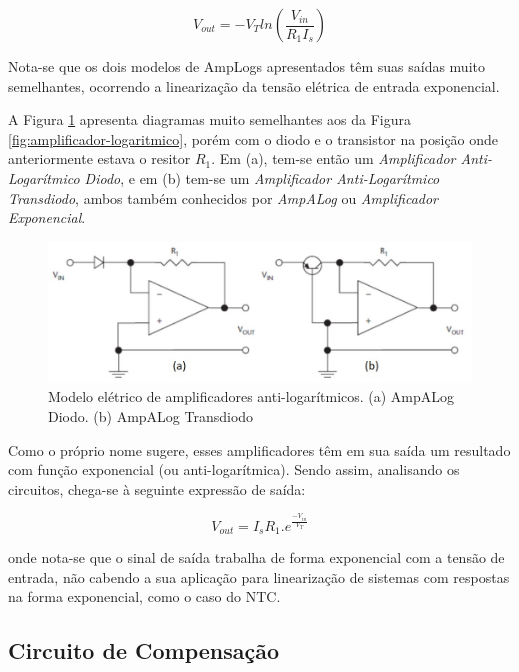 \documentclass[a4paper]{instrumentacao}
\begin{document}
\begin{equation}
	V_{out}= -V_T ln\left ( \frac{V_{in}}{R_1 I_s} \right )
	\label{eq:amplog-transdiodo-saida}
\end{equation}

Nota-se que os dois modelos de AmpLogs apresentados têm suas saídas muito semelhantes, ocorrendo a linearização da tensão elétrica de entrada exponencial.

A Figura \ref{fig:amplificador-antilogaritmico} apresenta diagramas muito semelhantes aos da Figura \ref{fig:amplificador-logaritmico}, porém com o diodo e o transistor na posição onde anteriormente estava o resitor $R_1$. Em (a), tem-se então um \textit{Amplificador Anti-Logarítmico Diodo}, e em (b) tem-se um \textit{Amplificador Anti-Logarítmico Transdiodo}, ambos também conhecidos por \textit{AmpALog} ou \textit{Amplificador Exponencial}.

\begin{figure}[H]
\center
\includegraphics[width=\textwidth]{amp_alog.jpg}
\caption{Modelo elétrico de amplificadores anti-logarítmicos. (a) AmpALog Diodo. (b) AmpALog Transdiodo}
\label{fig:amplificador-antilogaritmico}
\end{figure}

Como o próprio nome sugere, esses amplificadores têm em sua saída um resultado com função exponencial (ou anti-logarítmica). Sendo assim, analisando os circuitos, chega-se à seguinte expressão de saída:

\begin{equation}
	V_{out}=I_s R_1.e^\frac{-V_{in}}{V_T}
	\label{eq:ampalog-transdiodo-saida}
\end{equation}

\noindent
onde nota-se que o sinal de saída trabalha de forma exponencial com a tensão de entrada, não cabendo a sua aplicação para linearização de sistemas com respostas na forma exponencial, como o caso do NTC.

\subsection{Circuito de Compensação}
\end{document}
